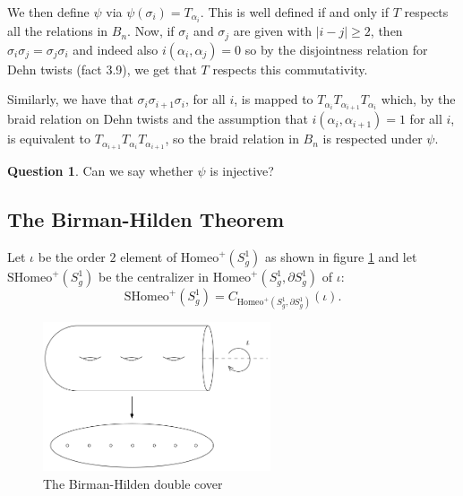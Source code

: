 \documentclass[reqno]{amsart}
\theoremstyle{definition}
\newtheorem{question}[theorem]{Question}
\theoremstyle{remark}
\newcommand{\Homeo}{{\mathrm{Homeo}}}
\newcommand{\SHomeo}{{\mathrm{SHomeo}}}
\begin{document}
 We then define $\psi $ via
 $\psi \left( \sigma_i \right) =
 T_{\alpha_i}$.
 This is well defined if and only if
 $T$ respects all the relations in
 $B_n$. Now, if $\sigma_i$ and
 $\sigma_j$ are given with 
 $\left| i-j \right| \ge 2$, then
 $\sigma_i \sigma_j = \sigma_j \sigma_i$ and
 indeed also
 $i \left( \alpha_i, \alpha_j \right) =0$ so
 by the disjointness relation for
 Dehn twists (fact 3.9), we get
 that $T$ respects this commutativity.

 Similarly, we have that
 $\sigma_i \sigma_{i+1} \sigma_i$, for all $i$,
 is mapped to 
 $T_{\alpha_i} T_{\alpha_{i+1}} T_{\alpha_i}$ which, by the
 braid relation on Dehn twists and the
 assumption that
 $i\left( \alpha_i, \alpha_{i+1} \right) =1$ for all $i$,
 is equivalent to
 $T_{\alpha_{i+1}} T_{\alpha_i}T_{\alpha_{i+1}}$, so
 the braid relation in $B_n$ is respected
 under $\psi $.

 \begin{question}
     Can we say whether $\psi $ is injective?
 \end{question}

 \subsection{The Birman-Hilden Theorem}
Let $\iota$ be the order  $2$ element of
$\Homeo^{+} \left( S_g^{1} \right) $ as
shown in figure \ref{fig:birman-hilden-double-cover-png}
and let $\SHomeo^{+} \left( S_g^{1} \right) $ be
the centralizer in
$\Homeo^{+}\left( S_g^{1}, \partial S_g^{1} \right) $ of
$\iota$:
\[
\SHomeo^{+} \left( S_g^{1} \right) 
= C_{\Homeo^{+} \left( S_g^{1}, \partial
S_g^{1} \right) }\left( \iota \right) .
\] 

 \begin{figure}[H]
     \centering
     \includegraphics[width=0.6\textwidth]{birman-hilden-double-cover.png}
     \caption{The Birman-Hilden double cover}
     \label{fig:birman-hilden-double-cover-png}
 \end{figure}
\end{document}
